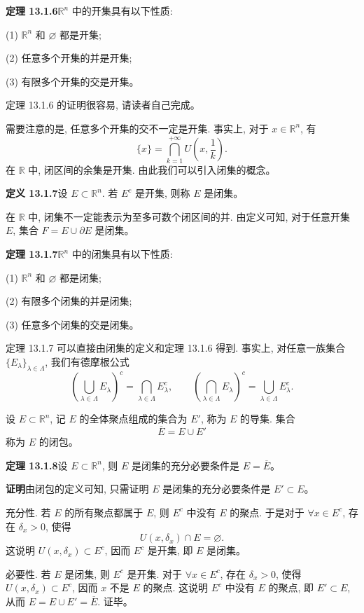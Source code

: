 \documentclass[UTF8, 12pt, fontset=fandol, oneside]{ctexart}
\begin{document}
\noindent\textbf{定理 13.1.6}\quad $\mathbb R^n$ 中的开集具有以下性质:

(1) $\mathbb R^n$ 和 $\varnothing$ 都是开集;

(2) 任意多个开集的并是开集;

(3) 有限多个开集的交是开集。

定理 13.1.6 的证明很容易, 请读者自己完成。

需要注意的是, 任意多个开集的交不一定是开集. 事实上, 对于 $x\in\mathbb R^n$, 有
\[
  \{x\}=\bigcap_{k=1}^{+\infty}U\left(x,\frac1k\right).
\]
在 $\mathbb R$ 中, 闭区间的余集是开集. 由此我们可以引入闭集的概念。

\noindent\textbf{定义 13.1.7}\quad 设 $E\subset\mathbb R^n$. 若 $E^c$ 是开集, 则称 $E$ 是闭集。

在 $\mathbb R$ 中, 闭集不一定能表示为至多可数个闭区间的并. 由定义可知, 对于任意开集 $E$, 集合 $F=E\cup\partial E$ 是闭集。

\noindent\textbf{定理 13.1.7}\quad $\mathbb R^n$ 中的闭集具有以下性质:

(1) $\mathbb R^n$ 和 $\varnothing$ 都是闭集;

(2) 有限多个闭集的并是闭集;

(3) 任意多个闭集的交是闭集。

定理 13.1.7 可以直接由闭集的定义和定理 13.1.6 得到. 事实上, 对任意一族集合 $\{E_\lambda\}_{\lambda\in\Lambda}$, 我们有德摩根公式
\[
  \left(\bigcup_{\lambda\in\Lambda}E_\lambda\right)^c
  =\bigcap_{\lambda\in\Lambda}E_\lambda^c,\qquad
  \left(\bigcap_{\lambda\in\Lambda}E_\lambda\right)^c
  =\bigcup_{\lambda\in\Lambda}E_\lambda^c.
\]

设 $E\subset\mathbb R^n$, 记 $E$ 的全体聚点组成的集合为 $E'$, 称为 $E$ 的导集. 集合
\[
  \overline E=E\cup E'
\]
称为 $E$ 的闭包。

\noindent\textbf{定理 13.1.8}\quad 设 $E\subset\mathbb R^n$, 则 $E$ 是闭集的充分必要条件是 $E=\overline E$。

\noindent\textbf{证明}\quad 由闭包的定义可知, 只需证明 $E$ 是闭集的充分必要条件是 $E'\subset E$。

充分性. 若 $E$ 的所有聚点都属于 $E$, 则 $E^c$ 中没有 $E$ 的聚点. 于是对于 $\forall x\in E^c$, 存在 $\delta_x>0$, 使得
\[
  U(x,\delta_x)\cap E=\varnothing.
\]
这说明 $U(x,\delta_x)\subset E^c$, 因而 $E^c$ 是开集, 即 $E$ 是闭集。

必要性. 若 $E$ 是闭集, 则 $E^c$ 是开集. 对于 $\forall x\in E^c$, 存在 $\delta_x>0$, 使得 $U(x,\delta_x)\subset E^c$, 因而 $x$ 不是 $E$ 的聚点. 这说明 $E^c$ 中没有 $E$ 的聚点, 即 $E'\subset E$, 从而 $E=E\cup E'=\overline E$. 证毕。
\end{document}
